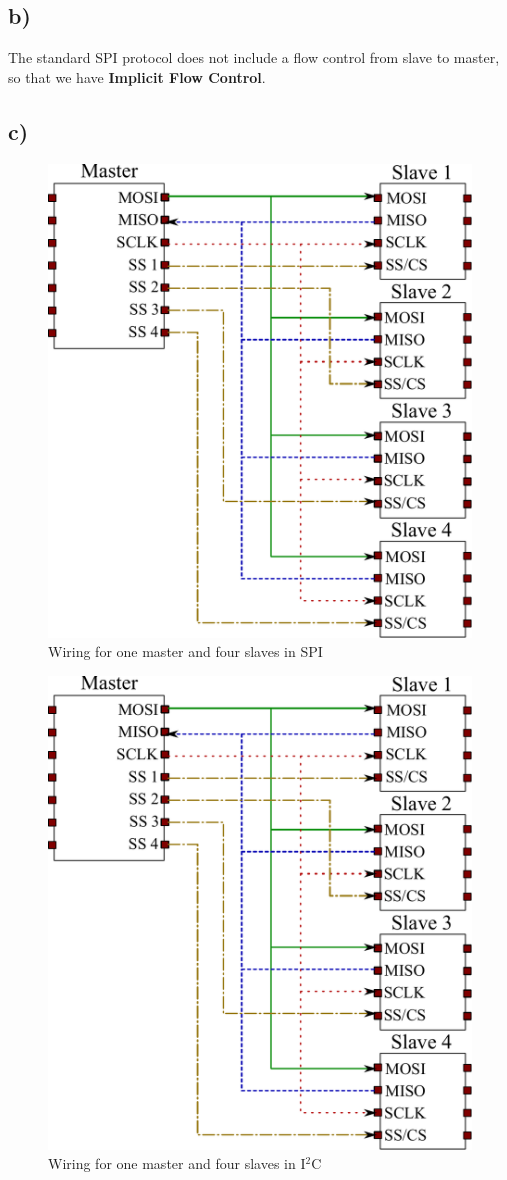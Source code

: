 \documentclass[12pt]{article}
\begin{document}
\subsection*{b)}
The standard SPI protocol does not include a flow control from slave to master, so that we have \textbf{Implicit Flow Control}.

\subsection*{c)}
\begin{figure}[h]
			\centering
			\includegraphics[scale = 0.5]{figures/SPI_drawing}
			\caption{Wiring for one master and four slaves in SPI}
\end{figure}
\begin{figure}[h]
			\centering
			\includegraphics[scale = 0.5]{figures/SPI_drawing}
			\caption{Wiring for one master and four slaves in I$^2$C}
\end{figure}
\end{document}
